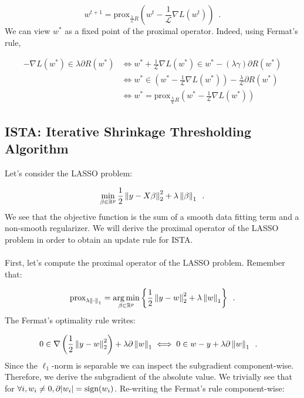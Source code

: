 \documentclass[a4paper,10pt]{article}
\theoremstyle{definition}
\begin{document}
\begin{equation*}
    w^{t+1} = \text{prox}_{\frac{\lambda}{\mathcal{L}}R}
    (w^t - \frac{1}{\mathcal{L}}\nabla L(w^{t}))
    \enspace .
\end{equation*}
%
We can view $w^*$ as a fixed point of the proximal operator. Indeed, using Fermat's rule,

\begin{align*}
    -\nabla L(w^*) \in \lambda \partial R(w^*)
     & \iff w^* + \frac{1}{\mathcal{L}} \nabla L(w^*) \in w^* - (\lambda\gamma) \partial R(w^*)               \\
     & \iff w^* \in (w^* - \frac{1}{\mathcal{L}} \nabla L(w^*)) - \frac{\lambda}{\mathcal{L}} \partial R(w^*) \\
     & \iff w^* = \text{prox}_{\frac{\lambda}{\mathcal{L}} R}(w^* - \frac{1}{\mathcal{L}} \nabla L(w^*))
\end{align*}

\subsection*{ISTA: Iterative Shrinkage Thresholding Algorithm}
\label{ista}

Let's consider the LASSO problem:

\begin{equation*}
    \min_{\beta \in \mathbb{R}^p} \frac{1}{2}
    \left \lVert y - X\beta \right \rVert_2^2
    + \lambda \left \lVert \beta \right \rVert_1
    \enspace .
\end{equation*}
%
We see that the objective function is the sum of a smooth data fitting term and
a non-smooth regularizer. We will derive the proximal operator of the LASSO problem
in order to obtain an update rule for ISTA.
\\
\\
First, let's compute the proximal operator of the LASSO problem. Remember that:

\begin{equation*}
    \text{prox}_{\lambda\left \lVert \cdot \right \rVert_1}
    =
    \operatorname*{arg\,min}_{\beta \in \mathbb{R}^p}
    \left\{
    \frac{1}{2}
    \left \lVert y - w \right \rVert_2^2
    + \lambda \left \lVert w \right \rVert_1
    \right\}
    \enspace .
\end{equation*}
%
The Fermat's optimality rule writes:

\begin{align*}
    0 \in \nabla
    \left(
    \frac{1}{2}
    \left \lVert y - w \right \rVert_2^2
    \right)
    + \lambda \partial \left \lVert w \right \rVert_1
     & \iff 0 \in
    w - y + \lambda \partial \left \lVert w \right \rVert_1
    \enspace .
\end{align*}
%
Since the $\ell_1$-norm is separable we can inspect the subgradient component-wise.
Therefore, we derive the subgradient of the absolute value. We trivially see that
for $\forall i, w_i \neq 0, \partial \lvert w_i \rvert = \text{sign}(w_i)$.
Re-writing the Fermat's rule component-wise:
\end{document}
